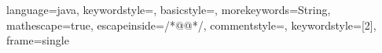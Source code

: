 \usepackage{color}
\usepackage{listings}
\usepackage{graphicx}
\usepackage{caption}
\usepackage{subcaption}


{language=java,
keywordstyle=\color{blue},
basicstyle=\ttfamily\scriptsize,
morekeywords={String},
mathescape=true,
escapeinside={/*@}{@*/},
commentstyle=\color{dkgreen},   %
keywordstyle=[2]{\color{red}},
frame=single
}